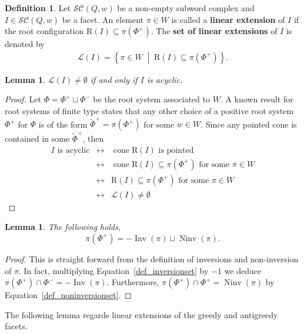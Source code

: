 \documentclass{amsart}
\newtheorem{lemma}[theorem]{Lemma}
\theoremstyle{definition}
\newtheorem{definition}[theorem]{Definition}
\newcommand{\set}[2]{\left\{ #1 \;\middle|\; #2 \right\}} %
\DeclareMathOperator{\cone}{cone} %
\DeclareMathOperator{\Inv}{Inv} %
\DeclareMathOperator{\Ninv}{Ninv} %
\newcommand{\defn}[1]{\textbf{\textsf{\color{PineGreen} #1}}} %
\newcommand{\linearExtensions}{\mathcal{L}} %
\newcommand{\subwordComplex}{\mathcal{SC}} %
\newcommand{\Roots}{\mathrm{R}} %
\begin{document}
\begin{definition}
Let $\subwordComplex(Q,w)$ be a non-empty subword complex and $I\in \subwordComplex(Q,w)$ be a facet. 
An element $\pi\in W$ is called a \defn{linear extension} of $I$ if the root configuration $\Roots(I)\subseteq \pi(\Phi^+)$.
The \defn{set of linear extensions} of $I$ is denoted by
\begin{align}
\linearExtensions(I)=
\set{\pi\in W}{\Roots(I)\subseteq \pi(\Phi^+)}.    
\end{align}
\end{definition}

\begin{lemma}
\label{lem_acyclic_nonempty}
$\linearExtensions(I)\neq \emptyset$ if and only if $I$ is acyclic.
\end{lemma}
\begin{proof}
Let $\Phi=\Phi^+\sqcup\Phi^-$ be the root system associated to $W$. 
A known result for root systems of finite type states that any other choice of a positive root system $\Phi^+$ for $\Phi$ is of the form $\widetilde \Phi^+=\pi(\Phi^+)$ for some $w\in W$. 
Since any pointed cone is contained in some $\widetilde \Phi^+$, then 
\[
\begin{array}{rcl}
I \text{ is acyclic}  & \longleftrightarrow  &  \cone \Roots(I) \text{ is pointed} \\
  & \longleftrightarrow  & \cone \Roots(I)\subseteq \pi(\Phi^+) \text{ for some } \pi\in W \\
  & \longleftrightarrow  &  \Roots(I)\subseteq \pi(\Phi^+) \text{ for some } \pi\in W \\
  & \longleftrightarrow  &  \linearExtensions(I) \neq \emptyset 
\end{array}
\]
\end{proof}

\begin{lemma}
\label{lem_pi_phiplus_inv_ninv}
The following holds,
\[
\pi(\Phi^+)=-\Inv(\pi)\sqcup \Ninv(\pi).
\]
\end{lemma}
\begin{proof}
This is straight forward from the definition of inversions and non-inversion of $\pi$. In fact, multiplying Equation~\eqref{def_inversionset} by $-1$ we deduce $\pi(\Phi^+)\cap \Phi^-=-\Inv(\pi)$. 
Furthermore,  
$\pi(\Phi^+)\cap \Phi^+=\Ninv(\pi)$ by Equation~\eqref{def_noninversionset}.
\end{proof}

The following lemma regards linear extensions of the greedy and antigreedy facets.
\end{document}
